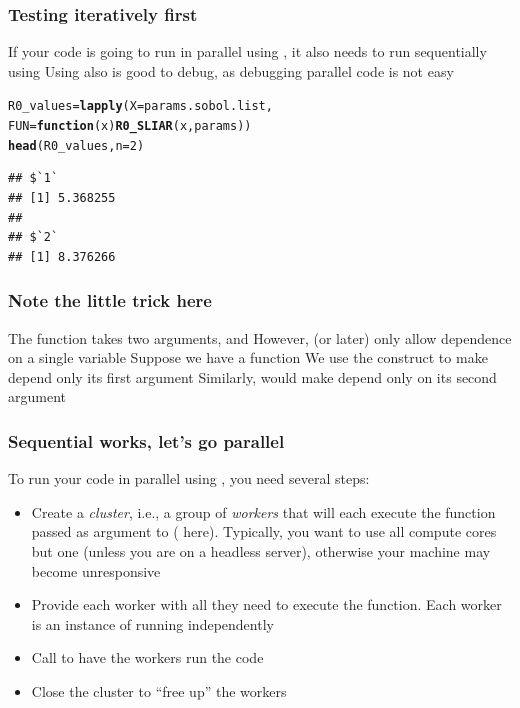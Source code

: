 \documentclass[aspectratio=169]{beamer}\usepackage[]{graphicx}\usepackage[]{xcolor}
\makeatletter
\newcommand{\hlnum}[1]{\textcolor[rgb]{0.686,0.059,0.569}{#1}}%
\newcommand{\hldef}[1]{\textcolor[rgb]{0.345,0.345,0.345}{#1}}%
\newcommand{\hlkwa}[1]{\textcolor[rgb]{0.161,0.373,0.58}{\textbf{#1}}}%
\newcommand{\hlkwb}[1]{\textcolor[rgb]{0.69,0.353,0.396}{#1}}%
\newcommand{\hlkwc}[1]{\textcolor[rgb]{0.333,0.667,0.333}{#1}}%
\newcommand{\hlkwd}[1]{\textcolor[rgb]{0.737,0.353,0.396}{\textbf{#1}}}%
\newenvironment{kframe}{%
 \def\at@end@of@kframe{}%
 \ifinner\ifhmode%
  \def\at@end@of@kframe{\end{minipage}}%
  \begin{minipage}{\columnwidth}%
 \fi\fi%
 \def\FrameCommand##1{\hskip\@totalleftmargin \hskip-\fboxsep
 \colorbox{shadecolor}{##1}\hskip-\fboxsep
     \hskip-\linewidth \hskip-\@totalleftmargin \hskip\columnwidth}%
 \MakeFramed {\advance\hsize-\width
   \@totalleftmargin\z@ \linewidth\hsize
   \@setminipage}}%
 {\par\unskip\endMakeFramed%
 \at@end@of@kframe}
\newenvironment{knitrout}{}{} %
\makeatother
\begin{document}
\begin{frame}[fragile]\frametitle{Testing iteratively first}
If your code is going to run in parallel using , it also needs to run sequentially using 
\vfill
Using  also is good to debug, as debugging parallel code is not easy
\vfill
\begin{knitrout}
\color{fgcolor}\begin{kframe}
\begin{alltt}
\hldef{R0_values} \hlkwb{=} \hlkwd{lapply}\hldef{(}\hlkwc{X} \hldef{= params.sobol.list,}
                   \hlkwc{FUN} \hldef{=} \hlkwa{function}\hldef{(}\hlkwc{x}\hldef{)} \hlkwd{R0_SLIAR}\hldef{(x, params))}
\hlkwd{head}\hldef{(R0_values,} \hlkwc{n} \hldef{=} \hlnum{2}\hldef{)}
\end{alltt}
\begin{verbatim}
## $`1`
## [1] 5.368255
## 
## $`2`
## [1] 8.376266
\end{verbatim}
\end{kframe}
\end{knitrout}
\end{frame}


\begin{frame}\frametitle{Note the little trick here}
The function  takes two arguments,  and 
\vfill
However,  (or  later) only allow dependence on a single variable
\vfill
Suppose we have a function 
\vfill
We use the construct  to make  depend only its first argument
\vfill
Similarly,  would make  depend only on its second argument
\end{frame}

\begin{frame}[fragile]\frametitle{Sequential works, let's go parallel}
To run your code in parallel using , you need several steps:
\vfill
\begin{itemize}
\item Create a \emph{cluster}, i.e., a group of \emph{workers} that will each execute the function passed as argument to  ( here). Typically, you want to use all compute cores but one (unless you are on a headless server), otherwise your machine may become unresponsive
\vfill
\item Provide each worker with all they need to execute the function. Each worker is an instance of  running independently
\vfill
\item Call  to have the workers run the code
\vfill
\item Close the cluster to ``free up'' the workers
\end{itemize}
\end{frame}
\end{document}
